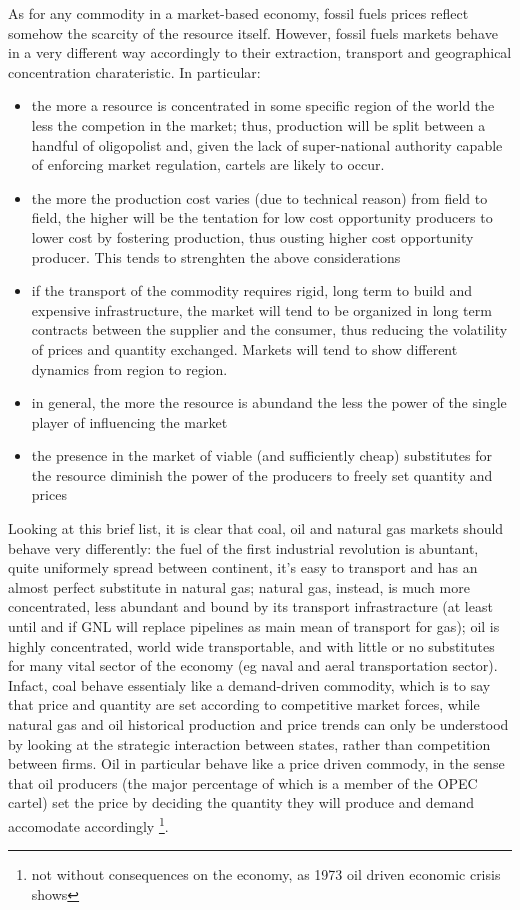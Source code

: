 \documentclass[11pt]{article} %
\begin{document}
As for any commodity in a market-based economy, fossil fuels prices reflect somehow the scarcity of the resource itself. However, fossil fuels markets behave in a very different way accordingly to their extraction, transport and geographical concentration charateristic. In particular: 
\begin{itemize}
\item the more a resource is concentrated in some specific region of the world the less the competion in the market; thus, production will be split between a handful of oligopolist and, given the lack of super-national authority capable of enforcing market regulation, cartels are likely to occur.
\item the more the production cost varies (due to technical reason) from field to field, the higher will be the tentation for low cost opportunity producers to lower cost by fostering production, thus ousting higher cost opportunity producer. This tends to strenghten the above considerations
\item if the transport of the commodity requires rigid, long term to build and expensive infrastructure, the market will tend to be organized in long term contracts between the supplier and the consumer, thus reducing the volatility of prices and quantity exchanged. Markets will tend to show different dynamics from region to region.
\item in general, the more the resource is abundand the less the power of the single player of influencing the market
\item the presence in the market of viable (and sufficiently cheap) substitutes for the resource diminish the power of the producers to freely set quantity and prices
\end{itemize}

Looking at this brief list, it is clear that coal, oil and natural gas markets should behave very differently: the fuel of the first industrial revolution is abuntant, quite uniformely spread between continent, it's easy to transport and has an almost perfect substitute in natural gas; natural gas, instead, is much more concentrated, less abundant and bound by its transport infrastracture (at least until and if GNL will replace pipelines as main mean of transport for gas); oil is highly concentrated, world wide transportable, and with little or no substitutes for many vital sector of the economy (eg naval and aeral transportation sector). Infact, coal behave essentialy like a demand-driven commodity, which is to say that price and quantity are set according to competitive market forces, while natural gas and oil historical production and price trends can only be understood by looking at the strategic interaction between states, rather than competition between firms. Oil in particular behave like a price driven commody, in the sense that oil producers (the major percentage of which is a member of the OPEC cartel) set the price by deciding the quantity they will produce and demand accomodate accordingly \footnote{not without consequences on the economy, as 1973 oil driven economic crisis shows}.
\end{document}
